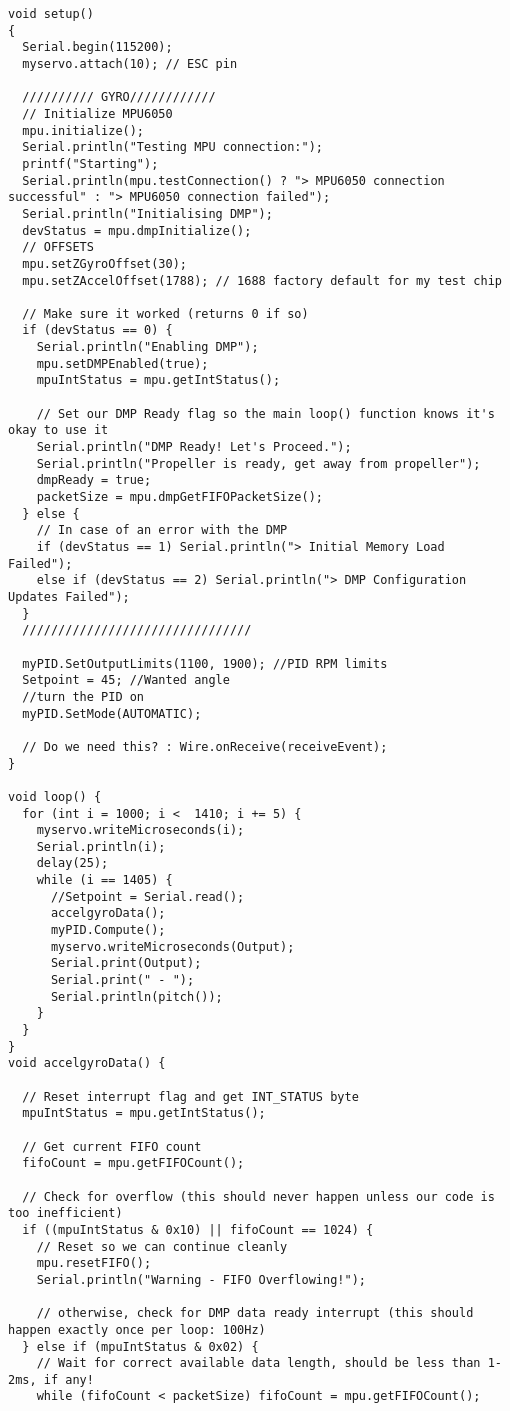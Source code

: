 \begin{lstlisting}
void setup()
{
  Serial.begin(115200);
  myservo.attach(10); // ESC pin
 
  ////////// GYRO////////////
  // Initialize MPU6050
  mpu.initialize();
  Serial.println("Testing MPU connection:");
  printf("Starting");
  Serial.println(mpu.testConnection() ? "> MPU6050 connection successful" : "> MPU6050 connection failed");
  Serial.println("Initialising DMP");
  devStatus = mpu.dmpInitialize();
  // OFFSETS
  mpu.setZGyroOffset(30);
  mpu.setZAccelOffset(1788); // 1688 factory default for my test chip
 
  // Make sure it worked (returns 0 if so)
  if (devStatus == 0) {
    Serial.println("Enabling DMP");
    mpu.setDMPEnabled(true);
    mpuIntStatus = mpu.getIntStatus();
 
    // Set our DMP Ready flag so the main loop() function knows it's okay to use it
    Serial.println("DMP Ready! Let's Proceed.");
    Serial.println("Propeller is ready, get away from propeller");
    dmpReady = true;
    packetSize = mpu.dmpGetFIFOPacketSize();
  } else {
    // In case of an error with the DMP
    if (devStatus == 1) Serial.println("> Initial Memory Load Failed");
    else if (devStatus == 2) Serial.println("> DMP Configuration Updates Failed");
  }
  ////////////////////////////////
 
  myPID.SetOutputLimits(1100, 1900); //PID RPM limits
  Setpoint = 45; //Wanted angle
  //turn the PID on
  myPID.SetMode(AUTOMATIC);
 
  // Do we need this? : Wire.onReceive(receiveEvent);
}
 
void loop() {
  for (int i = 1000; i <  1410; i += 5) {
    myservo.writeMicroseconds(i);
    Serial.println(i);
    delay(25);
    while (i == 1405) {
      //Setpoint = Serial.read();
      accelgyroData();
      myPID.Compute();
      myservo.writeMicroseconds(Output);
      Serial.print(Output);
      Serial.print(" - ");
      Serial.println(pitch());
    }
  }
}
void accelgyroData() {
 
  // Reset interrupt flag and get INT_STATUS byte
  mpuIntStatus = mpu.getIntStatus();
 
  // Get current FIFO count
  fifoCount = mpu.getFIFOCount();
 
  // Check for overflow (this should never happen unless our code is too inefficient)
  if ((mpuIntStatus & 0x10) || fifoCount == 1024) {
    // Reset so we can continue cleanly
    mpu.resetFIFO();
    Serial.println("Warning - FIFO Overflowing!");
 
    // otherwise, check for DMP data ready interrupt (this should happen exactly once per loop: 100Hz)
  } else if (mpuIntStatus & 0x02) {
    // Wait for correct available data length, should be less than 1-2ms, if any!
    while (fifoCount < packetSize) fifoCount = mpu.getFIFOCount();
 

\end{lstlisting}
